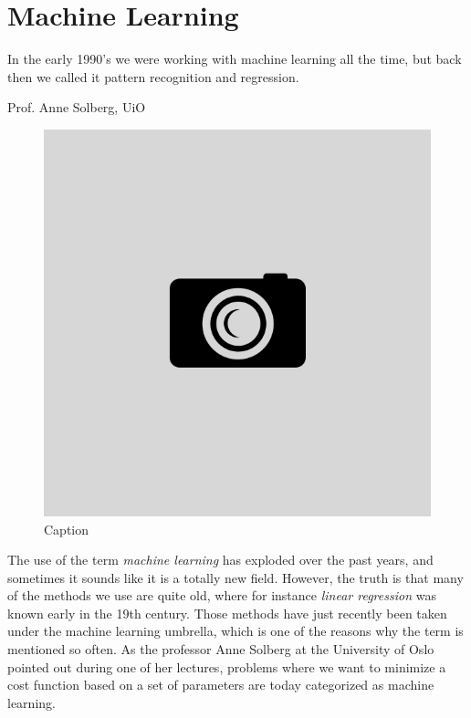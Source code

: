 \chapter{Machine Learning} \label{chp:machinelearning}
\epigraph{In the early 1990's we were working with machine learning all the time, but back then we called it pattern recognition and regression.}{Prof. Anne Solberg, UiO}
\begin{figure}[H]
	\centering
	\includegraphics[scale=0.4]{Images/example.png}
	\caption{Caption}
\end{figure}

The use of the term \textit{machine learning} has exploded over the past years, and sometimes it sounds like it is a totally new field. However, the truth is that many of the methods we use are quite old, where for instance \textit{linear regression} was known early in the 19th century. \cite{legendre_nouvelles_1805}\cite{gauss_theoria_1809} Those methods have just recently been taken under the machine learning umbrella, which is one of the reasons why the term is mentioned so often. As the professor Anne Solberg at the University of Oslo pointed out during one of her lectures, problems where we want to minimize a cost function based on a set of parameters are today categorized as machine learning.

